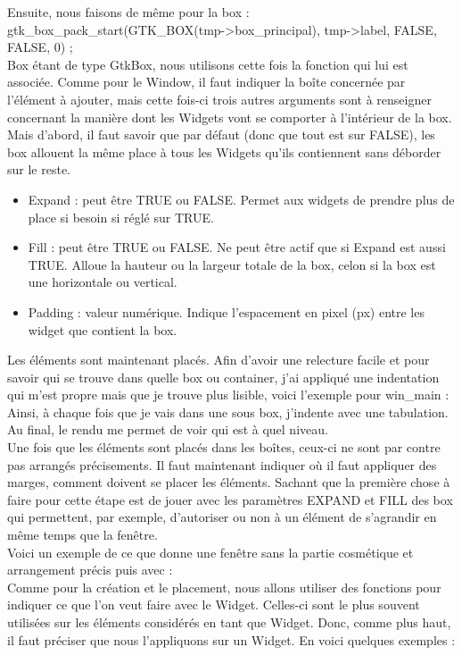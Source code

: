 \documentclass[11pt,french,a4paper]{report}
\begin{document}
Ensuite, nous faisons de même pour la box : \\
  gtk\_box\_pack\_start(GTK\_BOX(tmp->box\_principal), tmp->label, FALSE, FALSE, 0) ; \\
Box étant de type GtkBox, nous utilisons cette fois la fonction qui lui est associée. Comme pour le Window, il faut indiquer la 
boîte concernée par 
l'élément à ajouter, mais cette fois-ci trois autres arguments sont à renseigner concernant la manière dont les Widgets vont se 
comporter à l'intérieur
de la box. Mais d'abord, il faut savoir que par défaut (donc que tout est sur FALSE), les box allouent la même place à tous les 
Widgets qu'ils contiennent
sans déborder sur le reste.\\
\begin{itemize}
    \item Expand : peut être TRUE ou FALSE. Permet aux widgets de prendre plus de place si besoin si réglé sur TRUE. \\ 
    \item Fill : peut être TRUE ou FALSE. Ne peut être actif que si Expand est aussi TRUE. Alloue la hauteur ou la largeur totale
        de la box, 
        celon si la box est une horizontale ou vertical. \\
    \item Padding : valeur numérique. Indique l'espacement en pixel (px) entre les widget que contient la box. \\ 
\end{itemize}

Les éléments sont maintenant placés. Afin d'avoir une relecture facile et pour savoir qui se trouve dans quelle box ou container, 
j'ai appliqué une indentation 
qui m'est propre mais que je trouve plus lisible, voici l'exemple pour win\_main : \\
Ainsi, à chaque fois que je vais dans une sous box, j'indente avec une tabulation. Au final, le rendu me permet de voir qui est
à quel niveau. \\

Une fois que les éléments sont placés dans les boîtes, ceux-ci ne sont par contre pas arrangés précisements. Il faut maintenant 
indiquer où il faut appliquer des marges, 
comment doivent se placer les éléments. Sachant que la première chose à faire pour cette étape est de jouer avec les paramètres
EXPAND et FILL des box qui permettent, par exemple, d'autoriser ou non à un élément de s'agrandir en même temps que la fenêtre. \\
Voici un exemple de ce que donne une fenêtre sans la partie cosmétique et arrangement précis puis avec : \\ 
Comme pour la création et le placement, nous allons utiliser des fonctions pour indiquer ce que l'on veut faire avec le Widget.
Celles-ci sont le plus souvent utilisées sur les éléments considérés en tant que Widget. Donc, 
comme plus haut, il faut préciser que nous l'appliquons sur un Widget. En voici quelques exemples : \\
 
\end{document}
